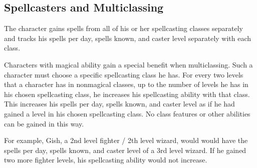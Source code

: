 \subsection{Spellcasters and Multiclassing}\label{Spellcasters and Multiclassing}
The character gains spells from all of his or her spellcasting classes separately and tracks his spells per day, spells known, and caster level separately with each class.

Characters with magical ability gain a special benefit when multiclassing. Such a character must choose a specific spellcasting class he has. For every two levels that a character has in nonmagical classes, up to the number of levels he has in his chosen spellcasting class, he increases his spellcasting ability with that class. This increases his spells per day, spells known, and caster level as if he had gained a level in his chosen spellcasting class. No class features or other abilities can be gained in this way. 

For example, Gish, a 2nd level fighter / 2th level wizard, would would have the spells per day, spells known, and caster level of a 3rd level wizard. If he gained two more fighter levels, his spellcasting ability would not increase.

